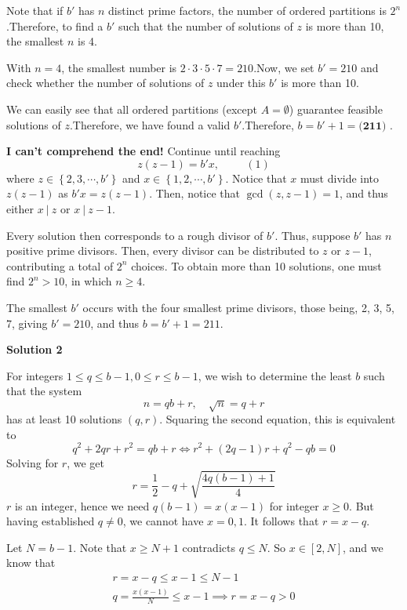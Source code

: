 \begin{enumerate}
 Note that if $b'$ has $n$ distinct prime factors, the number of ordered partitions is $2^n$.Therefore, to find a $b'$ such that the number of solutions of $z$ is more than 10, the smallest $n$ is 4.

 With $n = 4$, the smallest number is $2 \cdot 3 \cdot 5 \cdot 7 = 210$.Now, we set $b' = 210$ and check whether the number of solutions of $z$ under this $b'$ is more than 10.

 We can easily see that all ordered partitions (except $A = \emptyset$) guarantee feasible solutions of $z$.Therefore, we have found a valid $b'$.Therefore, $b = b' + 1 = \boxed{\textbf{(211) }}$.

 \textbf{I can't comprehend the end!} Continue until reaching 
 \[ z \left( z - 1 \right) = b' x , \hspace{1cm} (1) \]where $z \in \left\{ 2, 3, \cdots , b' \right\}$ and $x \in \left\{ 1, 2, \cdots , b' \right\}$. Notice that $x$ must divide into $z(z-1)$ as $b'x = z(z-1)$. Then, notice that $\gcd(z,z-1) = 1$, and thus either $x~|~ z$ or $x ~ | ~ z-1$.

 Every solution then corresponds to a rough divisor of $b'$. Thus, suppose $b'$ has $n$ positive prime divisors. Then, every divisor can be distributed to $z$ or $z-1$, contributing a total of $2^n$ choices.  To obtain more than 10 solutions, one must find $2^n > 10$, in which $n \ge 4$. 

 The smallest $b'$ occurs with the four smallest prime divisors, those being, 2, 3, 5, 7, giving $b' = 210$, and thus $b = b' + 1 = \boxed{211}$.

 



\textbf{Solution 2}

For integers $1\le q\le b-1, 0\le r\le b-1$, we wish to determine the least $b$ such that the system
 \[n=qb+r, \quad\sqrt{n}=q+r\]has at least 10 solutions $(q,r)$. Squaring the second equation, this is equivalent to
 \[q^2+2qr+r^2=qb+r\iff r^2+(2q-1)r+q^2-qb=0\]Solving for $r$, we get
 \[r=\frac{1}{2}-q+\sqrt{\frac{4q(b-1)+1}{4}}\]$r$ is an integer, hence we need $q(b-1)=x(x-1)$ for integer $x\ge 0$. But having established $q\neq 0$, we cannot have $x=0,1$. It follows that $r=x-q$.

 Let $N=b-1$. Note that $x\ge N+1$ contradicts $q\le N$. So $x\in [2, N]$, and we know that\begin{gather*}r=x-q\le x-1\le N-1\\q=\frac{x(x-1)}{N}\le x-1\implies r=x-q> 0\end{gather*}


\end{enumerate}
